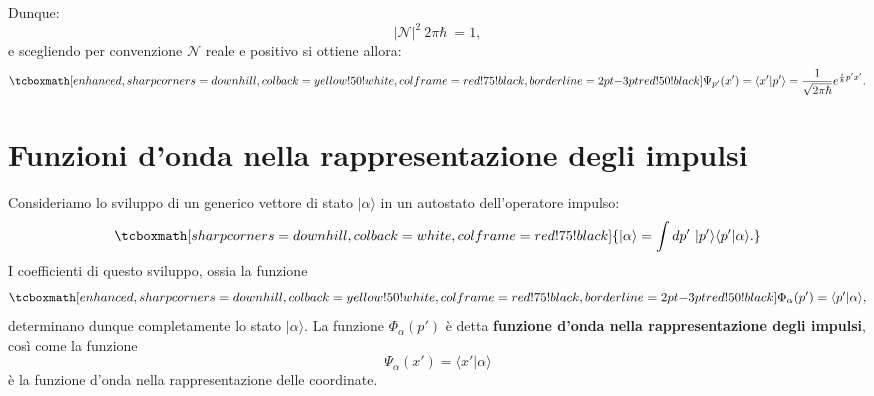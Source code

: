 \documentclass[a4paper,12pt,oneside]{book}
\begin{document}
Dunque:
	\begin{equation}
		\vert\mathcal{N} \vert ^2\ 2 \pi \hbar\ =1,
	\end{equation}
e scegliendo per convenzione $\mathcal{N}$ reale e positivo si ottiene allora:
	\begin{equation}
		\tcboxmath[enhanced,sharp corners=downhill ,colback=yellow!50!white,colframe=red!75!black, borderline={2pt}{-3pt}{red!50!black}]{
			\Psi_{p'}(x') = \langle x' | p' \rangle = \frac{1}{\sqrt{2 \pi \hbar}} e^{\frac{i}{\hbar}p'x'}.
			}
	\end{equation}

\section[Funzioni d'onda nella rappresentazione degli impulsi]{Funzioni d'onda nella rappresentazione degli impulsi}
Consideriamo lo sviluppo di un generico vettore di stato $| \alpha \rangle$ in un autostato dell'operatore impulso:
	\begin{equation}
		\tcboxmath[sharp corners=downhill ,colback=white,colframe=red!75!black]{
			| \alpha \rangle = \int dp' ~ | p' \rangle \langle p' | \alpha \rangle.
		}	
	\end{equation}
I coefficienti di questo sviluppo, ossia la funzione
	\begin{equation}
		\tcboxmath[enhanced,sharp corners=downhill ,colback=yellow!50!white,colframe=red!75!black, borderline={2pt}{-3pt}{red!50!black}]{
			\Phi_\alpha (p') =  \langle p' | \alpha \rangle,
			}
	\end{equation}
determinano dunque completamente lo stato $| \alpha \rangle$. La funzione $\Phi_\alpha (p')$ è detta \textbf{funzione d'onda nella rappresentazione degli impulsi}, così come la funzione
	\begin{equation}
		\Psi_\alpha (x') =  \langle x' | \alpha \rangle
	\end{equation}
è la funzione d'onda nella rappresentazione delle coordinate.\\
\end{document}
